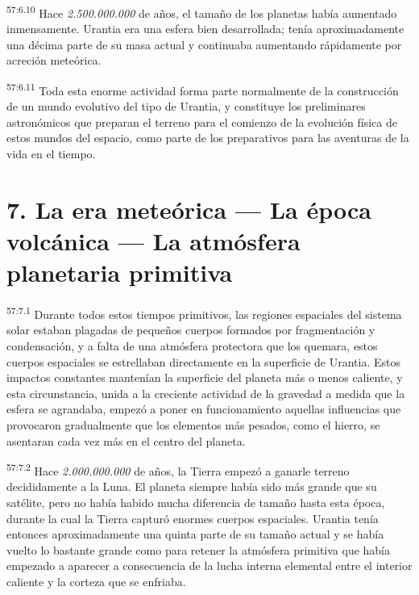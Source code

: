 \par
\textsuperscript{57:6.10} Hace \textit{2.500.000.000} de años, el tamaño de los planetas había aumentado inmensamente. Urantia era una esfera bien desarrollada; tenía aproximadamente una décima parte de su masa actual y continuaba aumentando rápidamente por acreción meteórica.

\par
\textsuperscript{57:6.11} Toda esta enorme actividad forma parte normalmente de la construcción de un mundo evolutivo del tipo de Urantia, y constituye los preliminares astronómicos que preparan el terreno para el comienzo de la evolución física de estos mundos del espacio, como parte de los preparativos para las aventuras de la vida en el tiempo.

\section*{7. La era meteórica --- La época volcánica --- La atmósfera planetaria primitiva}
\par
\textsuperscript{57:7.1} Durante todos estos tiempos primitivos, las regiones espaciales del sistema solar estaban plagadas de pequeños cuerpos formados por fragmentación y condensación, y a falta de una atmósfera protectora que los quemara, estos cuerpos espaciales se estrellaban directamente en la superficie de Urantia. Estos impactos constantes mantenían la superficie del planeta más o menos caliente, y esta circunstancia, unida a la creciente actividad de la gravedad a medida que la esfera se agrandaba, empezó a poner en funcionamiento aquellas influencias que provocaron gradualmente que los elementos más pesados, como el hierro, se asentaran cada vez más en el centro del planeta.

\par
\textsuperscript{57:7.2} Hace \textit{2.000.000.000} de años, la Tierra empezó a ganarle terreno decididamente a la Luna. El planeta siempre había sido más grande que su satélite, pero no había habido mucha diferencia de tamaño hasta esta época, durante la cual la Tierra capturó enormes cuerpos espaciales. Urantia tenía entonces aproximadamente una quinta parte de su tamaño actual y se había vuelto lo bastante grande como para retener la atmósfera primitiva que había empezado a aparecer a consecuencia de la lucha interna elemental entre el interior caliente y la corteza que se enfriaba.

